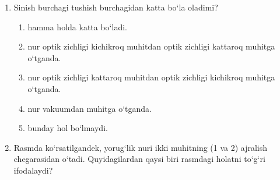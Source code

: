 \begin{enumerate}

\begin{enumerate}[label=\Alph*)]
\item a
\item a, b va c
\item c
\item a va b
\item b
\end{enumerate}

\item Sinish burchagi tushish burchagidan katta bo‘la oladimi?
\begin{enumerate}[label=\Alph*)]
\item hamma holda katta bo‘ladi.
\item nur optik zichligi kichikroq muhitdan optik zichligi kattaroq muhitga o‘tganda.
\item nur optik zichligi kattaroq muhitdan optik zichligi kichikroq muhitga o‘tganda.
\item nur vakuumdan muhitga o‘tganda.
\item bunday hol bo‘lmaydi.
\end{enumerate}

\item Rasmda ko‘rsatilgandek, yorug‘lik nuri ikki muhitning (1 va 2) ajralish chegarasidan o‘tadi. Quyidagilardan qaysi biri rasmdagi holatni to‘g‘ri ifodalaydi?



\end{enumerate}

